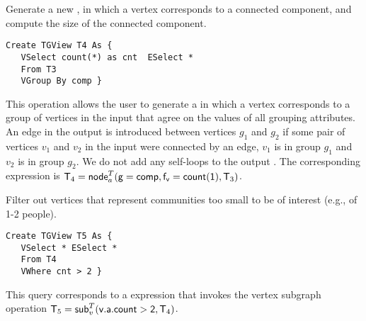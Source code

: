 

\begin{example}
\label{ex:nodecra}

Generate a new \tg, in which a vertex corresponds to a connected
component, and compute the size of the connected component.  

\begin{small} 
\begin{verbatim}
Create TGView T4 As { 
   VSelect count(*) as cnt  ESelect *
   From T3
   VGroup By comp }
\end{verbatim}
\end{small}

\end{example}
\vspace{-0.07in}

This operation allows the user to generate a \tg in which a vertex
corresponds to a group of vertices in the input that agree on the
values of all grouping attributes.  An edge in the output is
introduced between vertices $g_1$ and $g_2$ if some pair of vertices
$v_1$ and $v_2$ in the input \tg were connected by an edge, $v_1$ is
in group $g_1$ and $v_2$ is in group $g_2$.  We do not add any
self-loops to the output \tg. The corresponding \tga expression is
$\mathsf{T}_4 =
\textsf{node}^T_a(\mathsf{g=comp,f_v=count(1)},\mathsf{T}_3)$. 

\begin{example}
\label{ex:subg}
\vspace{-0.1cm}

Filter out vertices that represent communities too small to be of
interest (e.g., of 1-2 people).  

\begin{small} 
\begin{verbatim}
Create TGView T5 As {
   VSelect * ESelect *
   From T4
   VWhere cnt > 2 }
\end{verbatim}
\vspace{-0.1cm}
\end{small}

This query corresponds to a \tga expression that invokes the vertex
subgraph operation $\mathsf{T}_5 = \textsf{sub}^T_v(\mathsf{v.a.count > 2},\mathsf{T}_4)$.

\vspace{-0.1cm}
\end{example}

